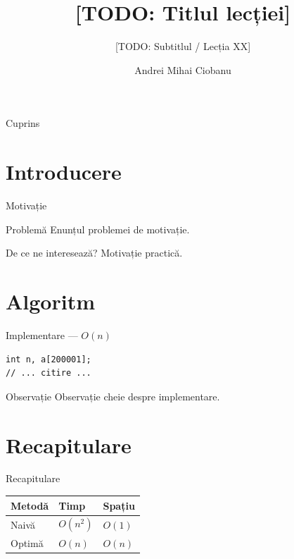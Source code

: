 \documentclass{beamer}
\title{[TODO: Titlul lecției]}
\subtitle{[TODO: Subtitlul / Lecția XX]}
\author{Andrei Mihai Ciobanu}
\institute{Algolymp Summer School}
\date{}
\begin{document}
\begin{frame}
  \titlepage
\end{frame}

\begin{frame}{Cuprins}
  \tableofcontents[hideallsubsections]
\end{frame}

\section{Introducere}

\begin{frame}{Motivație}
  \begin{block}{Problemă}
    Enunțul problemei de motivație.
  \end{block}
  \begin{alertblock}{De ce ne interesează?}
    Motivație practică.
  \end{alertblock}
\end{frame}

\section{Algoritm}

\begin{frame}[fragile]{Implementare --- $O(n)$}
  \begin{lstlisting}
int n, a[200001];
// ... citire ...
  \end{lstlisting}
  \begin{block}{Observație}
    Observație cheie despre implementare.
  \end{block}
\end{frame}

\section{Recapitulare}

\begin{frame}{Recapitulare}
  \begin{center}
  \begin{tabular}{lll}
    \toprule
    Metodă & Timp & Spațiu \\
    \midrule
    Naivă    & $O(n^2)$ & $O(1)$ \\
    Optimă   & $O(n)$   & $O(n)$ \\
    \bottomrule
  \end{tabular}
  \end{center}
\end{frame}
\end{document}
